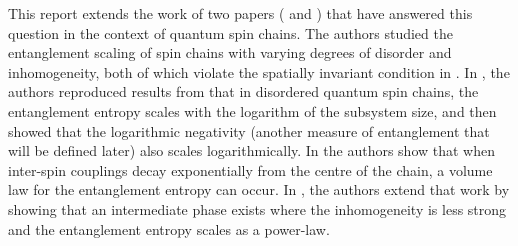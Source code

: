 This report extends the work of two papers (\cite{paola2016} and \cite{paola2018}) that have answered this question in the context of quantum spin chains. The authors studied the entanglement scaling of spin chains with varying degrees of disorder and inhomogeneity, both of which violate the spatially invariant condition in \cite{hastings_area_law}. In \cite{paola2016}, the authors reproduced results from \cite{refael2004} that in disordered quantum spin chains, the entanglement entropy scales with the logarithm of the subsystem size, and then showed that the logarithmic negativity (another measure of entanglement that will be defined later) also scales logarithmically. In \cite{Vitagliano2010} the authors show that when inter-spin couplings decay exponentially from the centre of the chain, a volume law for the entanglement entropy can occur. In \cite{paola2018}, the authors extend that work by showing that an intermediate phase exists where the inhomogeneity is less strong and the entanglement entropy scales as a power-law.







